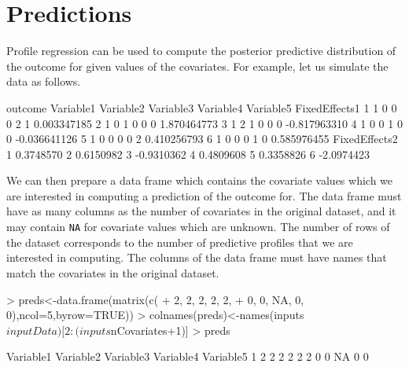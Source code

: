 \documentclass{article}
\begin{document}
\section{Predictions}
Profile regression can be used to compute the posterior predictive distribution of the outcome for given values of the covariates. For example, let us simulate the data as follows. 
\begin{Schunk}
\begin{Soutput}
  outcome Variable1 Variable2 Variable3 Variable4 Variable5 FixedEffects1
1       1         0         0         0         2         1   0.003347185
2       1         0         1         0         0         0   1.870464773
3       1         2         1         0         0         0  -0.817963310
4       1         0         0         1         0         0  -0.036641126
5       1         0         0         0         0         2   0.410256793
6       1         0         0         0         1         0   0.585976455
  FixedEffects2
1     0.3748570
2     0.6150982
3    -0.9310362
4     0.4809608
5     0.3358826
6    -2.0974423
\end{Soutput}
\end{Schunk}
We can then prepare a data frame which contains the covariate values which we are interested in computing a prediction of the outcome for. The data frame must have as many columns as the number of covariates in the original dataset, and it may contain \verb|NA| for covariate values which are unknown. The number of rows of the dataset corresponds to the number of predictive profiles that we are interested in computing. The columns of the data frame must have names that match the covariates in the original dataset.  
\begin{Schunk}
\begin{Sinput}
> preds<-data.frame(matrix(c(
+ 2, 2, 2, 2, 2,
+ 0, 0, NA, 0, 0),ncol=5,byrow=TRUE))
> colnames(preds)<-names(inputs$inputData)[2:(inputs$nCovariates+1)]
> preds
\end{Sinput}
\begin{Soutput}
  Variable1 Variable2 Variable3 Variable4 Variable5
1         2         2         2         2         2
2         0         0        NA         0         0
\end{Soutput}
\end{Schunk}
\end{document}
